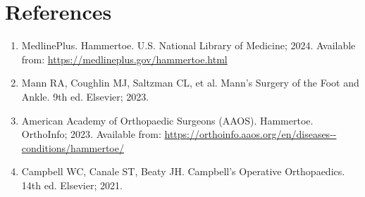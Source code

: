 \section*{References}
\begin{enumerate}
  \item MedlinePlus. Hammertoe. U.S. National Library of Medicine; 2024. Available from: \url{https://medlineplus.gov/hammertoe.html}
  
  \item Mann RA, Coughlin MJ, Saltzman CL, et al. Mann's Surgery of the Foot and Ankle. 9th ed. Elsevier; 2023.
  
  \item American Academy of Orthopaedic Surgeons (AAOS). Hammertoe. OrthoInfo; 2023. Available from: \url{https://orthoinfo.aaos.org/en/diseases--conditions/hammertoe/}
  
  \item Campbell WC, Canale ST, Beaty JH. Campbell's Operative Orthopaedics. 14th ed. Elsevier; 2021.
\end{enumerate}

\clearpage
